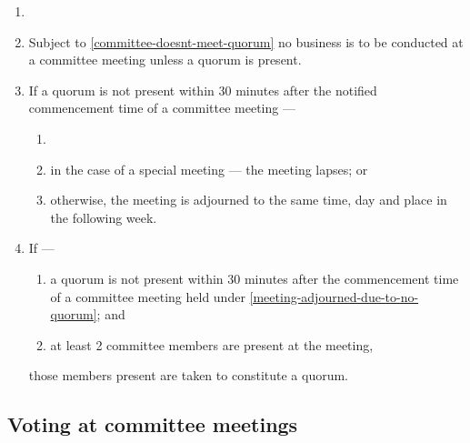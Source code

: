 \documentclass[../constitution.tex]{subfiles}
\begin{document}
\begin{enumerate}

\item {} 
\item Subject to  \ref{committee-doesnt-meet-quorum} no business is to be conducted at a committee meeting unless a quorum is present.
\item If a quorum is not present within 30 minutes after the notified commencement time of a committee meeting --- \label{no-quorum-after-30min}

  \begin{enumerate}
  
  \item {}
  \item in the case of a special meeting --- the meeting lapses; or
  \item otherwise, the meeting is adjourned to the same time, day and place in the following week. \label{meeting-adjourned-due-to-no-quorum}
  \end{enumerate}
\item If ---

  \begin{enumerate}
  
  \item a quorum is not present within 30 minutes after the commencement time of a committee meeting held under  \ref{meeting-adjourned-due-to-no-quorum}; and
  \item at least 2 committee members are present at the meeting,
  \end{enumerate}

  those members present are taken to constitute a quorum.

\end{enumerate}

\hypertarget{voting-at-committee-meetings}{%
\subsection{Voting at committee meetings}\label{voting-at-committee-meetings}}
\end{document}
